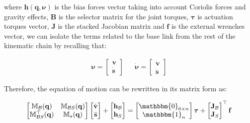 where $\mathbf{h}(\mathbf{q},\boldsymbol{\nu})$ is the bias forces vector taking into account Coriolis forces and gravity effects, $\mathbf{B}$ is the selector matrix for the joint torques, $\boldsymbol{\tau}$ is actuation torques vector, $\mathbf{J}$ is the stacked Jacobian matrix and $\mathbf{f}$ is the external wrenches vector, we can isolate the terms related to the base link from the rest of the kinematic chain by recalling that:

\begin{align}
    \boldsymbol{\nu} =
    \begin{bmatrix}
        \mathrm{\mathbf{v}} \\
        \dot{\mathbf{s}}
    \end{bmatrix} &  &
    \dot{\boldsymbol{\nu}} =
    \begin{bmatrix}
        \dot{\mathrm{\mathbf{v}}} \\
        \ddot{\mathbf{s}}
    \end{bmatrix}
\end{align}

Therefore, the equation of motion can be rewritten in its matrix form as:

\begin{equation}
    \begin{bmatrix}
        \mathbb{M} _{\mathcal{B}}(\mathbf{q})        & \mathbb{M} _{\mathcal{B}S}(\mathbf{q}) \\
        \mathbb{M} _{\mathcal{B}S} ^\top(\mathbf{q}) & \mathbb{M} _s(\mathbf{q})
    \end{bmatrix}
    \begin{bmatrix}
        \dot{\mathrm{\mathbf{v}}} \\
        \ddot{\mathbf{s}}
    \end{bmatrix}+
    \begin{bmatrix}
        \mathbf{h} _{\mathcal{B}} \\
        \mathbf{h} _S
    \end{bmatrix}=
    \begin{bmatrix}
        \mathbbm{0}_{6\times n} \\
        \mathbbm{1}_{n}
    \end{bmatrix}
    \boldsymbol{\tau}
    +
    \begin{bmatrix}
        \mathbf{J} _{\mathcal{B}} \\
        \mathbf{J} _S
    \end{bmatrix} ^\top
    \mathbf{f}
\end{equation}

